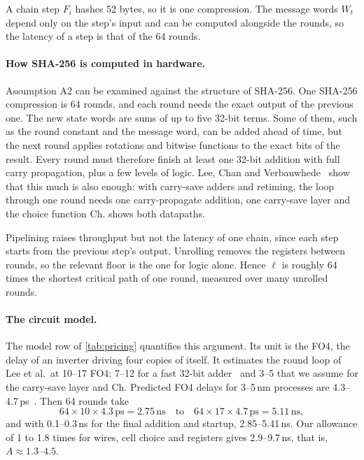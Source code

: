 

A chain step $F_i$ hashes 52 bytes, so it is one compression. The message words $W_t$ depend only on the step's input and can be computed alongside the rounds, so the latency of a step is that of the 64 rounds.

\paragraph{How SHA-256 is computed in hardware.}
Assumption A2 can be examined against the structure of SHA-256. One SHA-256 compression is 64 rounds, and each round needs the exact output of the previous one. The new state words are sums of up to five 32-bit terms. Some of them, such as the round constant and the message word, can be added ahead of time, but the next round applies rotations and bitwise functions to the exact bits of the result. Every round must therefore finish at least one 32-bit addition with full carry propagation, plus a few levels of logic. Lee, Chan and Verbauwhede~\cite{LCV07} show that this much is also enough: with carry-save adders and retiming, the loop through one round needs one carry-propagate addition, one carry-save layer and the choice function $\mathrm{Ch}$.  shows both datapaths.

Pipelining raises throughput but not the latency of one chain, since each step starts from the previous step's output. Unrolling removes the registers between rounds, so the relevant floor is the one for logic alone. Hence $\ell$ is roughly 64 times the shortest critical path of one round, measured over many unrolled rounds.

\paragraph{The circuit model.}
The model row of \cref{tab:pricing} quantifies this argument. Its unit is the FO4, the delay of an inverter driving four copies of itself. It estimates the round loop of Lee et al.\ at 10--17 FO4: 7--12 for a fast 32-bit adder~\cite{HS03} and 3--5 that we assume for the carry-save layer and $\mathrm{Ch}$. Predicted FO4 delays for 3--5\,nm processes are 4.3--4.7\,ps~\cite{NCTI21}. Then 64 rounds take
\[
  64 \times 10 \times 4.3\,\text{ps} = 2.75\,\text{ns}
  \quad\text{to}\quad
  64 \times 17 \times 4.7\,\text{ps} = 5.11\,\text{ns},
\]
and with 0.1--0.3\,ns for the final addition and startup, 2.85--5.41\,ns. Our allowance of 1 to 1.8 times for wires, cell choice and registers gives 2.9--9.7\,ns, that is, $A \approx 1.3$--$4.5$.

